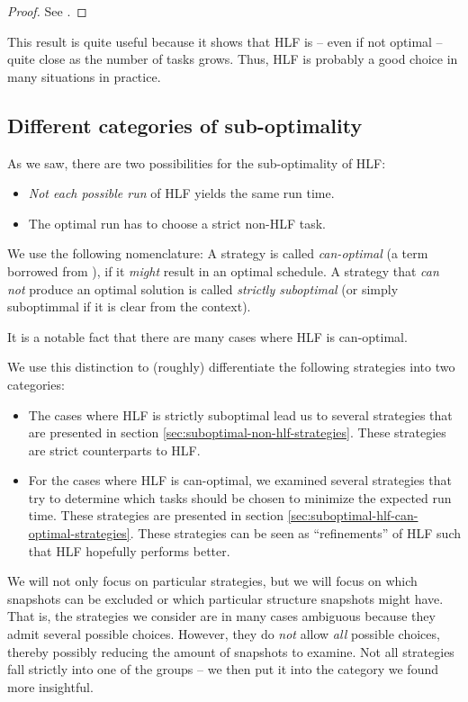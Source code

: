 \begin{proof}
  See \cite{journals/siamcomp/PapadimitriouT87}.
\end{proof}

This result is quite useful because it shows that HLF is -- even if not optimal -- quite close as the number of tasks grows. Thus, HLF is probably a good choice in many situations in practice.

\subsection{Different categories of sub-optimality}
\label{sec:hlf-suboptimal-two-variants}

As we saw, there are two possibilities for the sub-optimality of HLF:

\begin{itemize}
\item \emph{Not each possible run} of HLF yields the same run time.
\item The optimal run has to choose a strict non-HLF task.
\end{itemize}

We use the following nomenclature: A strategy is called \emph{can-optimal} (a term borrowed from \cite{MoritzMaasDiploma}), if it \emph{might} result in an optimal schedule. A strategy that \emph{can not} produce an optimal solution is called \emph{strictly suboptimal} (or simply suboptimmal if it is clear from the context). 

It is a notable fact that there are many cases where HLF is can-optimal. 

We use this distinction to (roughly) differentiate the following strategies into two categories: 

\begin{itemize}
\item The cases where HLF is strictly suboptimal lead us to several strategies that are presented in section \ref{sec:suboptimal-non-hlf-strategies}. These strategies are strict counterparts to HLF.
\item For the cases where HLF is can-optimal, we examined several strategies that try to determine which tasks should be chosen to minimize the expected run time. These strategies are presented in section \ref{sec:suboptimal-hlf-can-optimal-strategies}. These strategies can be seen as ``refinements'' of HLF such that HLF hopefully performs better.
\end{itemize}

We will not only focus on particular strategies, but we will focus on which snapshots can be excluded or which particular structure snapshots might have. That is, the strategies we consider are in many cases ambiguous because they admit several possible choices. However, they do \emph{not} allow \emph{all} possible choices, thereby possibly reducing the amount of snapshots to examine. Not all strategies fall strictly into one of the groups -- we then put it into the category we found more insightful. 

